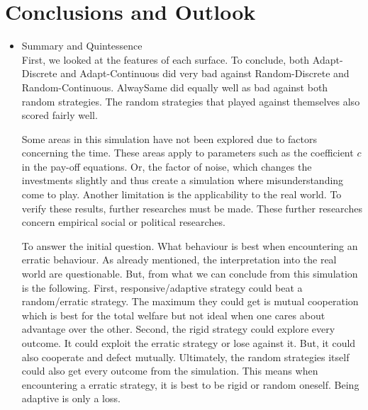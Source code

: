 \documentclass[11pt]{article}
\begin{document}
\section{Conclusions and Outlook}
\begin{itemize}

	\item Summary and Quintessence\\
		First, we looked at the features of each surface.
		To conclude, both Adapt-Discrete and Adapt-Continuous did very bad against Random-Discrete and Random-Continuous.
		AlwaySame did equally well as bad against both random strategies.
		The random strategies that played against themselves also scored fairly well.

		Some areas in this simulation have not been explored due to factors concerning the time.
		These areas apply to parameters such as the coefficient $c$ in the pay-off equations.
		Or, the factor of noise, which changes the investments slightly and thus create a simulation where misunderstanding come to play.
		Another limitation is the applicability to the real world.
		To verify these results, further researches must be made.
		These further researches concern empirical social or political researches.

		To answer the initial question.
		What behaviour is best when encountering an erratic behaviour.
		As already mentioned, the interpretation into the real world are questionable.
		But, from what we can conclude from this simulation is the following.
		First, responsive/adaptive strategy could beat a random/erratic strategy.
		The maximum they could get is mutual cooperation which is best for the total welfare but not ideal when one cares about advantage over the other.
		Second, the rigid strategy could explore every outcome.
		It could exploit the erratic strategy or lose against it.
		But, it could also cooperate and defect mutually.
		Ultimately, the random strategies itself could also get every outcome from the simulation.
		This means when encountering a erratic strategy, it is best to be rigid or random oneself.
		Being adaptive is only a loss.

\end{itemize}

%
%
%
\end{document}
